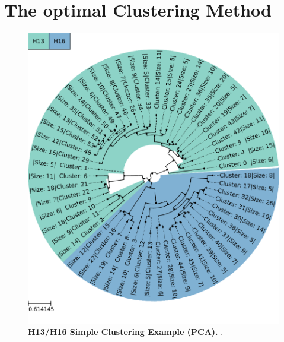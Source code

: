 \section{The optimal Clustering Method} \label{sec:Comparison_Clustering}

\blindtext

\begin{figure}[!hbt]
    \centering
    \includegraphics[width=\textwidth]{PCA/Clustertree_Segment_4_H_Simple.pdf}
    \caption[H13/H16 Simple Clustering Example (\Acrshort{PCA})]{\textbf{H13/H16 Simple Clustering Example (\Acrshort{PCA}).} .}
    \label{fig:Simple_Clustertree_PCA}
\end{figure}

